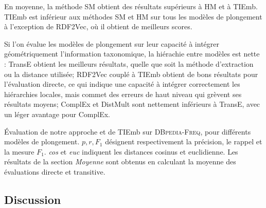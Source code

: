 En moyenne, la méthode SM obtient des résultats supérieurs à HM et à TIEmb. TIEmb est inférieur aux méthodes SM et HM sur tous les modèles de plongement à l'exception de RDF2Vec, où il obtient de meilleurs scores. 



Si l'on évalue les modèles de plongement sur leur capacité à intégrer géométriquement l'information taxonomique, la hiérachie entre modèles est nette : TransE obtient les meilleurs résultats, quelle que soit la méthode d'extraction ou la distance utilisée; RDF2Vec couplé à TIEmb obtient de bons résultats pour l'évaluation directe, ce qui indique une capacité à intégrer correctement les hiérarchies locales, mais commet des erreurs de haut niveau qui grèvent ses résultats moyens; ComplEx et DistMult sont nettement inférieurs à TransE, avec un léger avantage pour ComplEx.



\begin{table}
    \centering
    \caption[Évaluation de trois méthodes d'extraction de taxonomie]{
    Évaluation de notre approche et de TIEmb sur \textsc{DBpedia-Freq}, pour différents modèles de plongement. $p, r, F_1$ désignent respectivement la précision, le rappel et la mesure $F_1$. \textit{cos} et \textit{euc} indiquent les distances cosinus et euclidienne. Les résultats de la section \textit{Moyenne} sont obtenus en calculant la moyenne des évaluations directe et transitive.}
    \begin{adjustwidth}{-1in}{-1in}
        \begin{center}
            
            \label{tab:te-results} 
        \end{center}
    \end{adjustwidth}
\end{table}




\subsection{Discussion}
\label{subsec:te-discussion}


